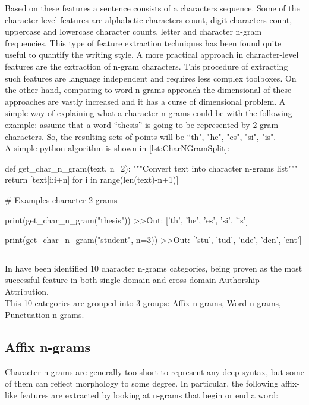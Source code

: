 Based on these features a sentence consists of a characters sequence. Some of the character-level features are alphabetic characters count, digit characters count, uppercase and lowercase character counts, letter and character n-gram frequencies. This type of feature extraction techniques has been found quite useful to quantify the writing style.\cite{grieve2007quantitative}
A more practical approach in character-level features are the extraction of n-gram characters. This procedure of extracting such features are language independent and requires less complex toolboxes. On the other hand, comparing to word n-grams approach the dimensional of these approaches are vastly increased and it has a curse of dimensional problem. A simple way of explaining what a character n-grams could be with the following example: assume that a word “thesis” is going to be represented by 2-gram characters. So, the resulting sets of points will be {“th", "he", "es", "si", "is"}.\\
A simple python algorithm is shown in \ref{lst:CharNGramSplit}:\\


\begin{python}
	def get_char_n_gram(text, n=2):
		"""Convert text into character n-grams list"""
		return [text[i:i+n] for i in range(len(text)-n+1)]
	
	# Examples character 2-grams
	
	print(get_char_n_gram("thesis"))
	>>Out: ['th', 'he', 'es', 'si', 'is']
	
	print(get_char_n_gram("student", n=3))
	>>Out: ['stu', 'tud', 'ude', 'den', 'ent']
\end{python}
\begin{lstlisting}[frame=none,caption={Split word into character n-grams, parametric on n},captionpos=b,label=lst:CharNGramSplit]
\end{lstlisting}

In \cite{sapkota2015not} have been identified 10 character n-grams categories, being proven as the most successful feature in both single-domain and cross-domain Authorship Attribution.\\
This 10 categories are grouped into 3 groups: Affix n-grams, Word n-grams, Punctuation n-grams.

\subsection{Affix n-grams}
Character n-grams are generally too short to represent any deep syntax, but some of them can reflect morphology to some degree. In particular, the following affix-like features are extracted by looking at n-grams that begin or end a word:


